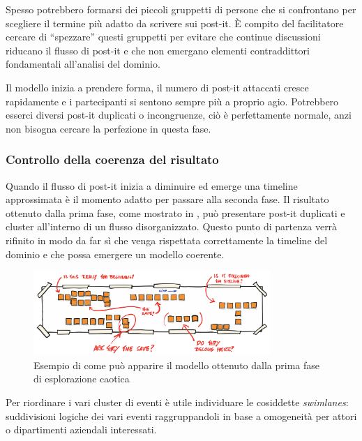 Spesso potrebbero formarsi dei piccoli gruppetti di persone che si confrontano per scegliere il termine più adatto da scrivere sui post-it. È compito del facilitatore cercare di ``spezzare'' questi gruppetti per evitare che continue discussioni riducano il flusso di post-it e che non emergano elementi contraddittori fondamentali all'analisi del dominio.

Il modello inizia a prendere forma, il numero di post-it attaccati cresce rapidamente e i partecipanti si sentono sempre più a proprio agio. Potrebbero esserci diversi post-it duplicati o incongruenze, ciò è perfettamente normale, anzi non bisogna cercare la perfezione in questa fase.

\subsubsection{Controllo della coerenza del risultato}
\label{sec:prima-riunione-controllo-della-coerenza-del-risultato}

Quando il flusso di post-it inizia a diminuire ed emerge una timeline approssimata è il momento adatto per passare alla seconda fase. Il risultato ottenuto dalla prima fase, come mostrato in , può presentare post-it duplicati e cluster all'interno di un flusso disorganizzato. Questo punto di partenza verrà rifinito in modo da far sì che venga rispettata correttamente la timeline del dominio e che possa emergere un modello coerente.

\begin{figure}[!ht]
  \centering
  \includegraphics[width=0.8\textwidth]{images/event-storming-exploration.png}
  \caption{Esempio di come può apparire il modello ottenuto dalla prima fase di esplorazione caotica}
  \label{fig:event-storming-exploration}
\end{figure}

Per riordinare i vari cluster di eventi è utile individuare le cosiddette \emph{swimlanes}: suddivisioni logiche dei vari eventi raggruppandoli in base a omogeneità per attori o dipartimenti aziendali interessati. 

